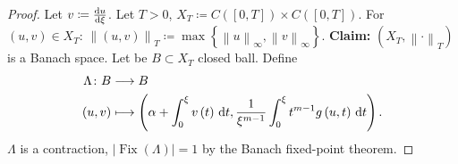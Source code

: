 \documentclass[
    landscape,
    paperwidth=48in,
    paperheight=36in,
    fontscale=0.3
]{baposter}
\theoremstyle{definition}
\begin{document}
\begin{poster}
{        \begin{proof}
            Let $v\coloneqq\diff{u}{\xi}$.
            Let $T>0$, $X_{T}\coloneqq C\left(\left[0,T\right]\right)\times C\left(\left[0,T\right]\right)$.\newline
            For $\left(u,v\right)\in X_{T}$:
            \begin{math}
                {\left\|\left(u,v\right)\right\|}_{T}\coloneqq
                \max
                \left\{
                {\left\|u\right\|}_{\infty},
                {\left\|v\right\|}_{\infty}
                \right\}
            \end{math}.\newline
            \textbf{Claim:} $\left(X_{T},{\left\|\cdot\right\|}_{T}\right)$ is a Banach space.
            Let be $B\subset X_{T}$ closed ball.
            Define
            \begin{align*}
                \Lambda\colon B & \longrightarrow B \\
                \left(u,v\right)
                                & \longmapsto
                \left(
                \alpha+
                \int_{0}^{\xi}
                v\left(t\right)\dl t,
                \frac{1}{\xi^{m-1}}
                \int_{0}^{\xi}
                t^{m-1}g\left(u,t\right)\dl t
                \right).
            \end{align*}
            $\Lambda$ is a contraction, $\left|\operatorname{Fix}\left(\Lambda\right)\right|=1$
            by the Banach fixed-point theorem.
        \end{proof}

}
\end{poster}
\end{document}
